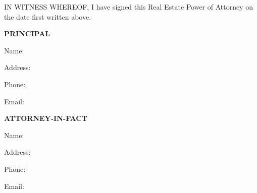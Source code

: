 
IN WITNESS WHEREOF, I have signed this Real Estate Power of Attorney on the date first written above.


\vspace{0.2in}
\hspace{3in}
\textbf{PRINCIPAL}

\vspace{0.2in}
\hspace{3in}
Name: \PrincipalName{}

\vspace{0.2in}

\hspace{3in}
\parbox{3.5in}{
Address: \PrincipalAddress{}
}
\vspace{0.2in}

\hspace{3in}
Phone: \PrincipalPhone{}

\vspace{0.2in}

\hspace{3in}
Email: \PrincipalEmail{}
\vspace{0.5in}


\hspace{3in}
\textbf{ATTORNEY-IN-FACT}

\vspace{0.2in}
\hspace{3in}
Name: \AttorneyName{}

\vspace{0.2in}

\hspace{3in}
\parbox{3.5in}{
Address: \AttorneyAddress{}
}
\vspace{0.2in}

\hspace{3in}
Phone: \AttorneyPhone{}

\vspace{0.2in}

\hspace{3in}
Email: \AttorneyEmail{}
\vspace{1in}

